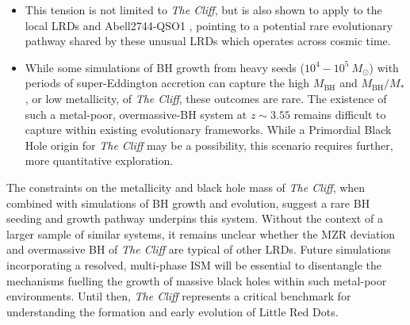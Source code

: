 \documentclass[fleqn,usenatbib]{mnras}
\newcommand{\cliff}{\textit{The Cliff}\xspace}
\begin{document}
\begin{itemize}
    \item This tension is not limited to \cliff, but is also shown to apply to the local LRDs \citep[][]{Lin2026} and Abell2744-QSO1 \citep{Maiolino2025_QSO1, Juodzbalis2025_QSO1}, pointing to a potential rare evolutionary pathway shared by these unusual LRDs which operates across cosmic time.
    \item While some simulations of BH growth from heavy seeds ($10^4-10^5 \ M_\odot$) with periods of super-Eddington accretion can capture the high $M_\mathrm{BH}$ and $M_\mathrm{BH}/M_\ast$, or low metallicity, of \cliff, these outcomes are rare. The existence of such a metal-poor, overmassive-BH system at $z\sim3.55$ remains difficult to capture within existing evolutionary frameworks. While a Primordial Black Hole origin for \cliff may be a possibility, this scenario requires further, more quantitative exploration. 
\end{itemize}

The constraints on the metallicity and black hole mass of \cliff, when combined with simulations of BH growth and evolution, suggest a rare BH seeding and growth pathway underpins this system. Without the context of a larger sample of similar systems, it remains unclear whether the MZR deviation and overmassive BH of \cliff are typical of other LRDs. Future simulations incorporating a resolved, multi-phase ISM will be essential to disentangle the mechanisms fuelling the growth of massive black holes within such metal-poor environments. Until then, \cliff represents a critical benchmark for understanding the formation and early evolution of Little Red Dots. 
\end{document}
